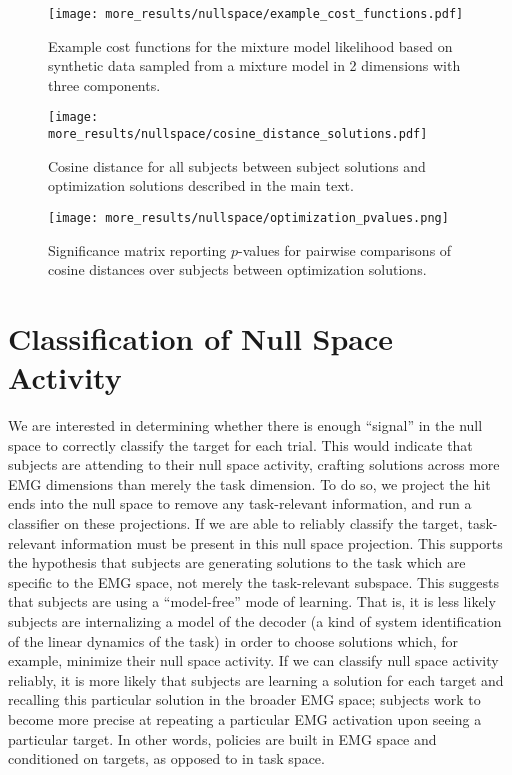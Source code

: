 \documentclass[../main.tex]{subfiles}
\begin{document}
  \begin{figure}[H]%
    \centering
    \texttt{[image: more\_results/nullspace/example\_cost\_functions.pdf]}
    \caption[Example cost functions]{Example cost functions for the mixture model likelihood based on synthetic data sampled from a mixture model in 2 dimensions with three components.}\label{fig:cost_functions}
  \end{figure}
  
  \begin{figure}[H]%
    \centering
    \texttt{[image: more\_results/nullspace/cosine\_distance\_solutions.pdf]}
    \caption[Cosine distance from optimization solutions]{Cosine distance for all subjects between subject solutions and optimization solutions described in the main text.}\label{fig:computed_distances}
  \end{figure}
  
  \begin{figure}[H]%
    \centering
    \texttt{[image: more\_results/nullspace/optimization\_pvalues.png]}
    \caption[Significance matrix for optimization solutions]{Significance matrix reporting $p$-values for pairwise comparisons of cosine distances over subjects between optimization solutions.}\label{fig:optimization_pvalues}
  \end{figure}
  
  
  
  
  
  
  \section{Classification of Null Space Activity}
  
     We are interested in determining whether there is enough ``signal'' in the null space to correctly classify the target for each trial. This would indicate that subjects are attending to their null space activity, crafting solutions across more EMG dimensions than merely the task dimension. To do so, we project the hit ends into the null space to remove any task-relevant information, and run a classifier on these projections. If we are able to reliably classify the target, task-relevant information must be present in this null space projection. This supports the hypothesis that subjects are generating solutions to the task which are specific to the EMG space, not merely the task-relevant subspace. This suggests that subjects are using a ``model-free'' mode of learning. That is, it is less likely subjects are internalizing a model of the decoder (a kind of system identification of the linear dynamics of the task) in order to choose solutions which, for example, minimize their null space activity. If we can classify null space activity reliably, it is more likely that subjects are learning a solution for each target and recalling this particular solution in the broader EMG space; subjects work to become more precise at repeating a particular EMG activation upon seeing a particular target. In other words, policies are built in EMG space and conditioned on targets, as opposed to in task space.
     
\end{document}

